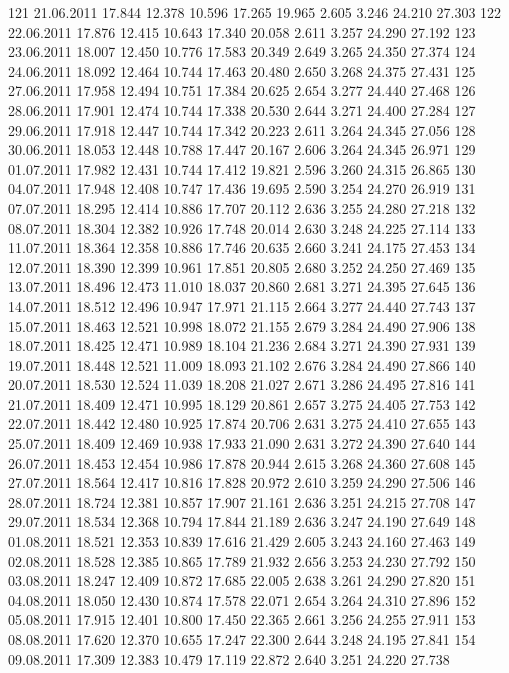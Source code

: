 \documentclass[a4paper,11pt]{scrartcl}
\begin{document}
\begin{Schunk}
\begin{Soutput}
121 21.06.2011 17.844 12.378 10.596 17.265 19.965  2.605  3.246 24.210 27.303
122 22.06.2011 17.876 12.415 10.643 17.340 20.058  2.611  3.257 24.290 27.192
123 23.06.2011 18.007 12.450 10.776 17.583 20.349  2.649  3.265 24.350 27.374
124 24.06.2011 18.092 12.464 10.744 17.463 20.480  2.650  3.268 24.375 27.431
125 27.06.2011 17.958 12.494 10.751 17.384 20.625  2.654  3.277 24.440 27.468
126 28.06.2011 17.901 12.474 10.744 17.338 20.530  2.644  3.271 24.400 27.284
127 29.06.2011 17.918 12.447 10.744 17.342 20.223  2.611  3.264 24.345 27.056
128 30.06.2011 18.053 12.448 10.788 17.447 20.167  2.606  3.264 24.345 26.971
129 01.07.2011 17.982 12.431 10.744 17.412 19.821  2.596  3.260 24.315 26.865
130 04.07.2011 17.948 12.408 10.747 17.436 19.695  2.590  3.254 24.270 26.919
131 07.07.2011 18.295 12.414 10.886 17.707 20.112  2.636  3.255 24.280 27.218
132 08.07.2011 18.304 12.382 10.926 17.748 20.014  2.630  3.248 24.225 27.114
133 11.07.2011 18.364 12.358 10.886 17.746 20.635  2.660  3.241 24.175 27.453
134 12.07.2011 18.390 12.399 10.961 17.851 20.805  2.680  3.252 24.250 27.469
135 13.07.2011 18.496 12.473 11.010 18.037 20.860  2.681  3.271 24.395 27.645
136 14.07.2011 18.512 12.496 10.947 17.971 21.115  2.664  3.277 24.440 27.743
137 15.07.2011 18.463 12.521 10.998 18.072 21.155  2.679  3.284 24.490 27.906
138 18.07.2011 18.425 12.471 10.989 18.104 21.236  2.684  3.271 24.390 27.931
139 19.07.2011 18.448 12.521 11.009 18.093 21.102  2.676  3.284 24.490 27.866
140 20.07.2011 18.530 12.524 11.039 18.208 21.027  2.671  3.286 24.495 27.816
141 21.07.2011 18.409 12.471 10.995 18.129 20.861  2.657  3.275 24.405 27.753
142 22.07.2011 18.442 12.480 10.925 17.874 20.706  2.631  3.275 24.410 27.655
143 25.07.2011 18.409 12.469 10.938 17.933 21.090  2.631  3.272 24.390 27.640
144 26.07.2011 18.453 12.454 10.986 17.878 20.944  2.615  3.268 24.360 27.608
145 27.07.2011 18.564 12.417 10.816 17.828 20.972  2.610  3.259 24.290 27.506
146 28.07.2011 18.724 12.381 10.857 17.907 21.161  2.636  3.251 24.215 27.708
147 29.07.2011 18.534 12.368 10.794 17.844 21.189  2.636  3.247 24.190 27.649
148 01.08.2011 18.521 12.353 10.839 17.616 21.429  2.605  3.243 24.160 27.463
149 02.08.2011 18.528 12.385 10.865 17.789 21.932  2.656  3.253 24.230 27.792
150 03.08.2011 18.247 12.409 10.872 17.685 22.005  2.638  3.261 24.290 27.820
151 04.08.2011 18.050 12.430 10.874 17.578 22.071  2.654  3.264 24.310 27.896
152 05.08.2011 17.915 12.401 10.800 17.450 22.365  2.661  3.256 24.255 27.911
153 08.08.2011 17.620 12.370 10.655 17.247 22.300  2.644  3.248 24.195 27.841
154 09.08.2011 17.309 12.383 10.479 17.119 22.872  2.640  3.251 24.220 27.738

\end{Soutput}
\end{Schunk}
\end{document}
